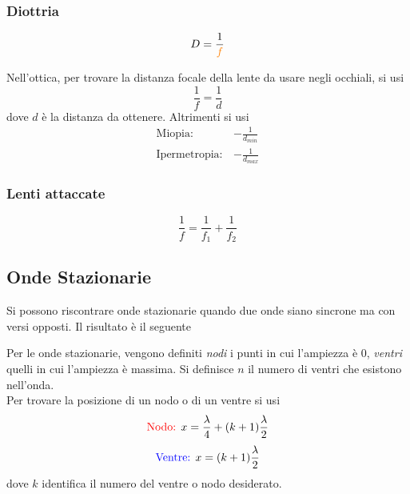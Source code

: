 \subsubsection{Diottria}
\begin{equation*}
D = \frac{1}{\mathcolor{orange}{f}}
\end{equation*}

Nell'ottica, per trovare la distanza focale della lente da usare negli occhiali, si usi
\begin{equation*}
  \frac{1}{f} =  \frac{1}{d} 
\end{equation*}
dove $d$ è la distanza da ottenere. Altrimenti si usi
\begin{align*}
  \text{Miopia:}\,&-\frac{1}{d_{min}}\\
  \text{Ipermetropia:}\,&-\frac{1}{d_{max}} 
\end{align*}


\subsubsection{Lenti attaccate}
\begin{equation*}
\frac{1}{f} = \frac{1}{f_1}+\frac{1}{f_2}
\end{equation*}

\subsection{Onde Stazionarie}
Si possono riscontrare onde stazionarie quando due onde siano sincrone ma con versi opposti. Il 
risultato è il seguente

\begin{center}
\end{center}

Per le onde stazionarie, vengono definiti \emph{nodi} i punti in cui l'ampiezza è  $0$,
\emph{ventri} quelli in cui l'ampiezza è massima. Si definisce $n$ il numero di ventri che 
esistono nell'onda.\\

Per trovare la posizione di un nodo o di un ventre si usi
\begin{equation*}
\mathcolor{red}{\text{Nodo: }} x = \frac{\lambda}{4}+(k+1)\frac{\lambda}{2}
\end{equation*}
\begin{equation*}
\mathcolor{blue}{\text{Ventre: }} x = (k+1)\frac{\lambda}{2}
\end{equation*}
dove $k$ identifica il numero del ventre o nodo desiderato.

